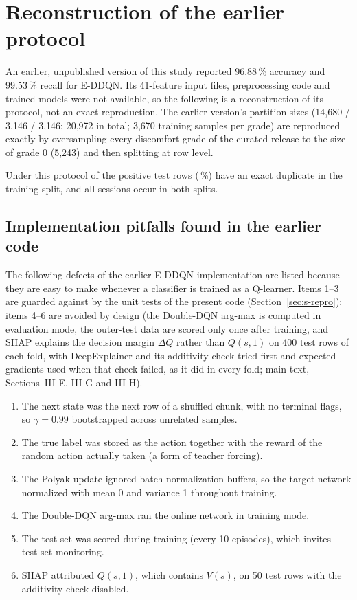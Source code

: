 \section{Reconstruction of the earlier protocol}
\label{sec:s-earlier}
An earlier, unpublished version of this study reported 96.88\,\% accuracy and 99.53\,\% recall for E-DDQN. Its 41-feature input files, preprocessing code and trained models were not available, so the following is a reconstruction of its protocol, not an exact reproduction. The earlier version's partition sizes (14,680 / 3,146 / 3,146; 20,972 in total; 3,670 training samples per grade) are reproduced exactly by oversampling every discomfort grade of the curated release to the size of grade 0 (5,243) and then splitting at row level.

\noindent\resizebox{\textwidth}{!}{}

\medskip
Under this protocol \LeakDupPos{} of the \LeakTestPos{} positive test rows (\LeakDupPct\,\%) have an exact duplicate in the training split, and all sessions occur in both splits.

\subsection*{Implementation pitfalls found in the earlier code}
The following defects of the earlier E-DDQN implementation are listed because they are easy to make whenever a classifier is trained as a Q-learner. Items 1--3 are guarded against by the unit tests of the present code (Section~\ref{sec:s-repro}); items 4--6 are avoided by design (the Double-DQN arg-max is computed in evaluation mode, the outer-test data are scored only once after training, and SHAP explains the decision margin $\Delta Q$ rather than $Q(s,1)$ on 400 test rows of each fold, with DeepExplainer and its additivity check tried first and expected gradients used when that check failed, as it did in every fold; main text, Sections~III-E, III-G and III-H).
\begin{enumerate}
\item The next state was the next row of a shuffled chunk, with no terminal flags, so $\gamma=0.99$ bootstrapped across unrelated samples.
\item The true label was stored as the action together with the reward of the random action actually taken (a form of teacher forcing).
\item The Polyak update ignored batch-normalization buffers, so the target network normalized with mean 0 and variance 1 throughout training.
\item The Double-DQN arg-max ran the online network in training mode.
\item The test set was scored during training (every 10 episodes), which invites test-set monitoring.
\item SHAP attributed $Q(s,1)$, which contains $V(s)$, on 50 test rows with the additivity check disabled.
\end{enumerate}
